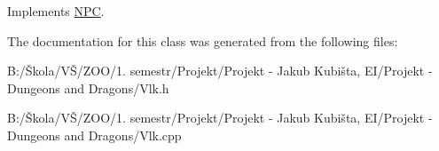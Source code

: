 Implements \hyperlink{class_n_p_c_a3987735754198ab346e6dc09a5d24bbf}{N\-P\-C}.



The documentation for this class was generated from the following files\-:\begin{DoxyCompactItemize}
\item 
B\-:/Škola/\-VŠ/\-Z\-O\-O/1. semestr/\-Projekt/\-Projekt -\/ Jakub Kubišta, E\-I/\-Projekt -\/ Dungeons and Dragons/Vlk.\-h\item 
B\-:/Škola/\-VŠ/\-Z\-O\-O/1. semestr/\-Projekt/\-Projekt -\/ Jakub Kubišta, E\-I/\-Projekt -\/ Dungeons and Dragons/Vlk.\-cpp\end{DoxyCompactItemize}
